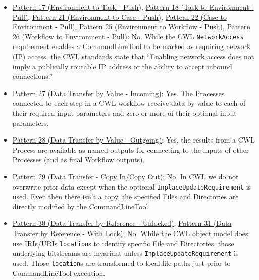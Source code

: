 \begin{itemize}
\item \href{http://www.workflowpatterns.com/patterns/data/external/wdp17.php}{Pattern 17 (Environment to Task - Push)}, \href{http://www.workflowpatterns.com/patterns/data/external/wdp18.php}{Pattern 18 (Task to Environment - Pull)}, \href{http://www.workflowpatterns.com/patterns/data/external/wdp21.php}{Pattern 21 (Environment to Case - Push)}, \href{http://www.workflowpatterns.com/patterns/data/external/wdp22.php}{Pattern 22 (Case to Environment - Pull)}, \href{http://www.workflowpatterns.com/patterns/data/external/wdp25.php}{Pattern 25 (Environment to Workflow - Push)}, \href{http://www.workflowpatterns.com/patterns/data/external/wdp26.php}{Pattern 26 (Workflow to Environment - Pull)}: No. While the CWL \verb|NetworkAccess| requirement enables a CommandLineTool to be marked as requiring network (IP) access, the CWL standards state that “Enabling network access does not imply a publically routable IP address or the ability to accept inbound connections.”

\item \href{http://www.workflowpatterns.com/patterns/data/mechanisms/wdp27.php}{Pattern 27 (Data Transfer by Value - Incoming)}: Yes. The Processes connected to each step in a CWL workflow receive data by value to each of their required input parameters and zero or more of their optional input parameters.

\item \href{http://www.workflowpatterns.com/patterns/data/mechanisms/wdp28.php}{Pattern 28 (Data Transfer by Value - Outgoing)}: Yes, the results from a CWL Process are available as named outputs for connecting to the inputs of other Processes (and as final Workflow outputs).

\item \href{http://www.workflowpatterns.com/patterns/data/mechanisms/wdp29.php}{Pattern 29 (Data Transfer - Copy In/Copy Out)}: No. In CWL we do not overwrite prior data except when the optional \verb|InplaceUpdateRequirement| is used. Even then there isn’t a copy, the specified Files and Directories are directly modified by the CommandLineTool.

\item \href{http://www.workflowpatterns.com/patterns/data/mechanisms/wdp30.php}{Pattern 30 (Data Transfer by Reference - Unlocked)}, \href{http://www.workflowpatterns.com/patterns/data/mechanisms/wdp31.php}{Pattern 31 (Data Transfer by Reference - With Lock)}: 
No. While the CWL object model does use IRIs/URIs \verb|location|s to identify specific File and Directories, those underlying bitstreams are invariant unless \verb|InplaceUpdateRequirement| is used. Those \verb|location|s are transformed to local file paths just prior to CommandLineTool execution.


\end{itemize}
